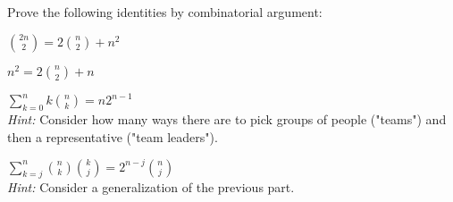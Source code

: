 \newcommand{\sblank}{\vspace{1in}}
Prove the following identities by combinatorial argument:
\begin{Parts}


  	\Part $\binom{2n}{2} = 2 \binom{n}{2} + n^2$

  	\Part $n^2 = 2 \binom{n}{2} + n$

    \Part $\sum_{k=0}^n k {n \choose k} = n2^{n-1}$ \\
    \textit{Hint:} Consider how many ways there are to pick groups of people ("teams") and then a representative ("team leaders").

    \Part $\sum_{k=j}^n {n \choose k} {k \choose j} = 2^{n-j} {n \choose j}$ \\
    \textit{Hint:} Consider a generalization of the previous part.

\end{Parts}



